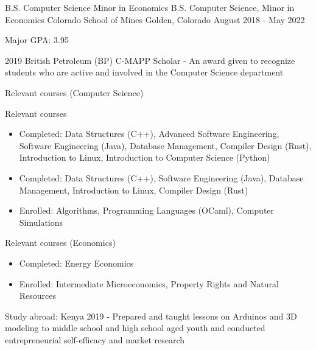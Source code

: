 \vspace{-2.0mm}


\begin{cventries}

  \cventry
    {\ifcv B.S. Computer Science \newline \vspace{-1mm} Minor in Economics \else B.S. Computer Science, Minor in Economics \fi}
    {Colorado School of Mines} %
    {Golden, Colorado} %
    {August 2018 - May 2022} %
    {
      \begin{cvitems} %
        \item {Major GPA: 3.95}
    \item {2019 British Petroleum (BP) C-MAPP Scholar - An award given to recognize students who are active and involved in the Computer Science department}
        \ifcv
        \item {Relevant courses (Computer Science)}
        \else
        \item {Relevant courses}
        \fi
        \begin {itemize}
        \ifcv
               \item {Completed: Data Structures (C++), Advanced Software Engineering, Software
    Engineering (Java), Database Management, Compiler Design (Rust), Introduction to Linux, Introduction to Computer Science (Python)}
    \else
    \item {Completed: Data Structures (C++), Software
    Engineering (Java), Database Management, Introduction to Linux, Compiler Design (Rust)}
    \fi
        \item {Enrolled: Algorithms, Programming Languages (OCaml), Computer Simulations}
        \end {itemize}
        \ifcv
        \item {Relevant courses (Economics)}
        \begin{itemize}
          \item Completed: Energy Economics
          \item Enrolled: Intermediate Microeconomics, Property Rights and Natural Resources
        \end{itemize}
        \fi
    \ifcv
\item {Study abroad: Kenya 2019 - Prepared and taught lessons on Arduinos and 3D modeling to
middle school and high school aged youth and conducted entrepreneurial self-efficacy and market research }
\fi
      \end{cvitems}
    }
    {}
\end{cventries}